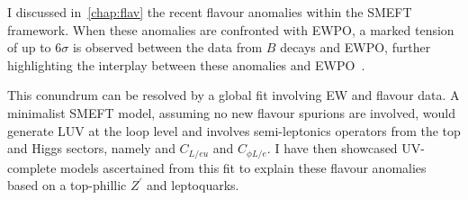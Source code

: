 \par I discussed in~\autoref{chap:flav} the recent flavour anomalies within the SMEFT framework. When these anomalies are confronted with EWPO, a marked tension of up to $ 6\sigma$ is observed between the data from $B$ decays and EWPO, further highlighting the interplay between these anomalies and EWPO~\cite{Bhattacharya:2014wla,Feruglio:2016gvd,Celis:2017doq,Buttazzo:2017ixm, Kumar:2018kmr,Ciuchini:2019usw,Aebischer:2019mlg,Cornella:2019hct}.
\par This conundrum can be resolved by a global fit involving EW and flavour data. A minimalist SMEFT model, assuming no new flavour spurions are involved, would generate LUV at the loop level and involves semi-leptonics operators from the top and Higgs sectors, namely and 	$C_{L/eu}$ and  $ C_{\phi L/e}$. I have then showcased UV-complete models ascertained from this fit to explain these flavour anomalies based on a top-phillic $Z^\prime$ and leptoquarks.